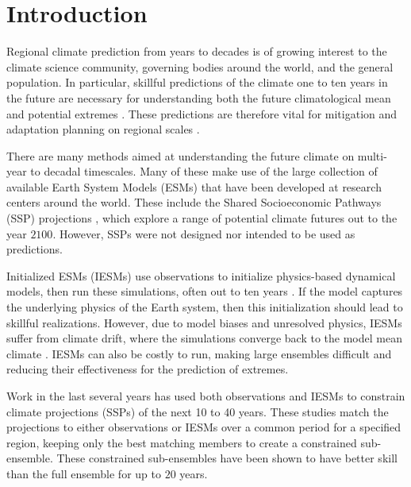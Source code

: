 \section{Introduction}\label{sec:intro}

Regional climate prediction from years to decades is of growing interest to the climate science community, governing bodies around the world, and the general population.
In particular, skillful predictions of the climate one to ten years in the future are necessary for understanding both the future climatological mean and potential extremes \cite{wmo, IPCC_WG1}.
These predictions are therefore vital for mitigation and adaptation planning on regional scales \cite{Khasnis2005, Solaraju2022, Dunstone2022, IPCC_WG2, IPCC_WG3}.

There are many methods aimed at understanding the future climate on multi-year to decadal timescales.
Many of these make use of the large collection of available Earth System Models (ESMs) that have been developed at research centers around the world.
These include the Shared Socioeconomic Pathways (SSP) projections \cite{eyring2016}, which explore a range of potential climate futures out to the year $2100$.
However, SSPs were not designed nor intended to be used as predictions.

Initialized ESMs (IESMs) use observations to initialize physics-based dynamical models, then run these simulations, often out to ten years \cite{meehl2021}.
If the model captures the underlying physics of the Earth system, then this initialization should lead to skillful realizations.
However, due to model biases and unresolved physics, IESMs suffer from climate drift, where the simulations converge back to the model mean climate \cite{meehl2021, meehl2022}.
IESMs can also be costly to run, making large ensembles difficult and reducing their effectiveness for the prediction of extremes.

Work in the last several years \cite{Befort2020, Mahmood2021, Befort2022, DeLuca2023, Donat2024} has used both observations and IESMs to constrain climate projections (SSPs) of the next 10 to 40 years.
These studies match the projections to either observations or IESMs over a common period for a specified region, keeping only the best matching members to create a constrained sub-ensemble.
These constrained sub-ensembles have been shown to have better skill than the full ensemble for up to $20$ years.

